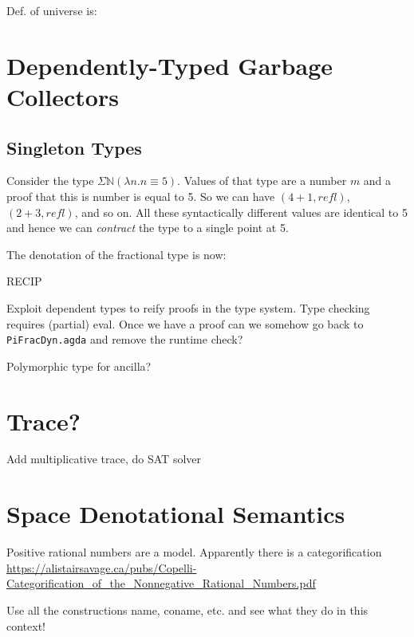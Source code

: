 \documentclass[sigplan,10pt,review,anonymous]{acmart}
\begin{document}
Def. of universe is:

\Udef{}

\section{Dependently-Typed Garbage Collectors}

\subsection{Singleton Types}

Consider the type $\Sigma \mathbb{N} (\lambda n. n \equiv 5)$. Values
of that type are a number $m$ and a proof that this is number is equal
to 5. So we can have $(4 + 1, \textit{refl})$, $(2 + 3 ,
\textit{refl})$, and so on. All these syntactically different values
are identical to 5 and hence we can \emph{contract} the type to a
single point at 5. 

The denotation of the fractional type is now:

RECIP 

Exploit dependent types to reify proofs in the type system. Type
checking requires (partial) eval. Once we have a proof can we somehow
go back to \verb|PiFracDyn.agda| and remove the runtime check?

Polymorphic type for ancilla?

\section{Trace?}
  
Add multiplicative trace, do SAT solver

\section{Space Denotational Semantics}
  
Positive rational numbers are a model. Apparently there is a
categorification
\url{https://alistairsavage.ca/pubs/Copelli-Categorification_of_the_Nonnegative_Rational_Numbers.pdf}

Use all the constructions name, coname, etc. and see what they do in this context!


\end{document}
